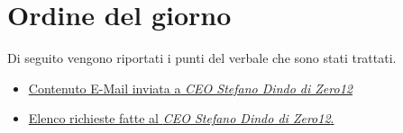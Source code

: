 \clearpage
\section{Ordine del giorno}
Di seguito vengono riportati i punti del verbale che sono stati trattati.
\begin{itemize}
	\item \hyperref[sec:contenuto]{Contenuto E-Mail inviata a \emph{CEO Stefano Dindo di Zero12}}
	\item \hyperref[sec:elenco]{ Elenco richieste fatte al \emph{CEO Stefano Dindo di Zero12}.}	
\end{itemize}